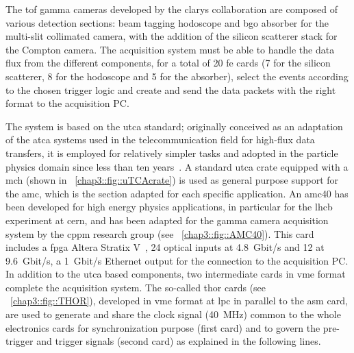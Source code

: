 The \gls{tof} gamma cameras developed by the \gls{clarys} collaboration are composed of various detection sections: beam tagging hodoscope and \gls{bgo} absorber for the multi-slit collimated camera, with the addition of the silicon scatterer stack for the Compton camera. The acquisition system must be able to handle the data flux from the different components, for a total of 20 \gls{fe} cards (7 for the silicon scatterer, 8 for the hodoscope and 5 for the absorber), select the events according to the chosen trigger logic and create and send the data packets with the right format to the acquisition PC.

The system is based on the \gls{utca} standard; originally conceived as an adaptation of the \gls{atca} systems used in the telecommunication field for high-flux data transfers, it is employed for relatively simpler tasks and adopted in the particle physics domain since less than ten years~\parencite{Cachemiche2012, Abellan2013}. A standard \gls{utca} crate equipped with a \gls{mch} (shown in \figurename~\ref{chap3::fig::uTCAcrate}) is used as general purpose support for the \gls{amc}, which is the section adapted for each specific application. An \gls{amc}40 has been developed for high energy physics applications, in particular for the \gls{lhcb} experiment at \gls{cern}, and has been adapted for the gamma camera acquisition system by the \gls{cppm} research group (see \figurename~\ref{chap3::fig::AMC40}). This card includes a \gls{fpga} Altera Stratix V~\parencite{Altera2015}, 24 optical inputs at 4.8~Gbit/s and 12 at 9.6~Gbit/s, a 1~Gbit/s Ethernet output for the connection to the acquisition PC. In addition to the \gls{utca} based components, two intermediate cards in \gls{vme} format complete the acquisition system. The so-called \gls{thor} cards (see \figurename~\ref{chap3::fig::THOR}), developed in \gls{vme} format at \gls{lpc} in parallel to the \gls{asm} card, are used to generate and share the clock signal (40~MHz) common to the whole electronics cards for synchronization purpose (first card) and to govern the pre-trigger and trigger signals (second card) as explained in the following lines.

